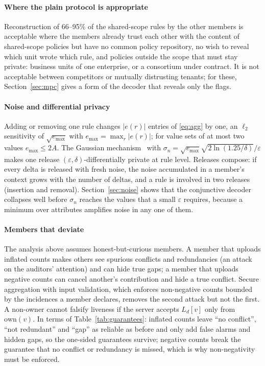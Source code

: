 \documentclass[preprint,12pt]{elsarticle}
\theoremstyle{definition}
\begin{document}
\paragraph{Where the plain protocol is appropriate} Reconstruction of 66--95\% of the shared-scope rules by the other members is acceptable where the members already trust each other with the content of shared-scope policies but have no common policy repository, no wish to reveal which unit wrote which rule, and policies outside the scope that must stay private: business units of one enterprise, or a consortium under contract. It is not acceptable between competitors or mutually distrusting tenants; for these, Section~\ref{sec:mpc} gives a form of the decoder that reveals only the flags.

\paragraph{Noise and differential privacy} Adding or removing one rule changes $|e(r)|$ entries of \eqref{eq:agg} by one, an $\ell_2$ sensitivity of $\sqrt{e_{\max}}$ with $e_{\max}=\max_r|e(r)|$; for value sets of at most two values $e_{\max}\le2A$. The Gaussian mechanism~\cite{dwork2014algorithmic} with $\sigma_{\!n}=\sqrt{e_{\max}}\sqrt{2\ln(1.25/\delta)}/\varepsilon$ makes one release $(\varepsilon,\delta)$-differentially private at rule level. Releases compose: if every delta is released with fresh noise, the noise accumulated in a member's context grows with the number of deltas, and a rule is involved in two releases (insertion and removal). Section~\ref{sec:noise} shows that the conjunctive decoder collapses well before $\sigma_{\!n}$ reaches the values that a small $\varepsilon$ requires, because a minimum over attributes amplifies noise in any one of them.

\paragraph{Members that deviate} The analysis above assumes honest-but-curious members. A member that uploads inflated counts makes others see spurious conflicts and redundancies (an attack on the auditors' attention) and can hide true gaps; a member that uploads negative counts can cancel another's contribution and hide a true conflict. Secure aggregation with input validation, which enforces non-negative counts bounded by the incidences a member declares, removes the second attack but not the first. A non-owner cannot falsify liveness if the server accepts $L_{d}[v]$ only from $\mathrm{own}(v)$. In terms of Table~\ref{tab:guarantees}: inflated counts leave ``no conflict'', ``not redundant'' and ``gap'' as reliable as before and only add false alarms and hidden gaps, so the one-sided guarantees survive; negative counts break the guarantee that no conflict or redundancy is missed, which is why non-negativity must be enforced.
\end{document}
